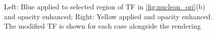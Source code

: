 \documentclass[twoside,twocolumn,10pt]{article}
\begin{document}
\begin{figure}
	\caption{Left: Blue applied to selected region of TF in \autoref{fig:nucleon_ori}(b) and opacity enhanced; Right: Yellow applied and opacity enhanced. The modified TF is shown for each case alongside the rendering}
	\label{fig:Nucleon_2}
\end{figure}



\end{document}
